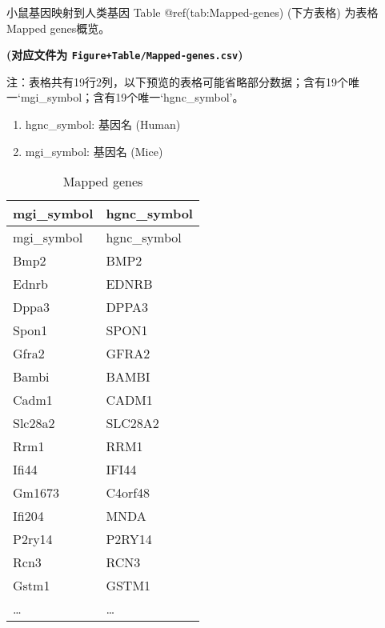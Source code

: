 \documentclass[
  ignorenonframetext,
]{beamer}
\providecommand{\tightlist}{%
  \setlength{\itemsep}{0pt}\setlength{\parskip}{0pt}}
\begin{document}
\begin{frame}[fragile]{小鼠基因映射到人类基因}
\protect\hypertarget{ux5c0fux9f20ux57faux56e0ux6620ux5c04ux5230ux4ebaux7c7bux57faux56e0}{}
Table @ref(tab:Mapped-genes) (下方表格) 为表格Mapped genes概览。

\textbf{(对应文件为 \texttt{Figure+Table/Mapped-genes.csv})}

\begin{center}\begin{tcolorbox}[colback=gray!10, colframe=gray!50, width=0.9\linewidth, arc=1mm, boxrule=0.5pt]注：表格共有19行2列，以下预览的表格可能省略部分数据；含有19个唯一`mgi\_symbol；含有19个唯一`hgnc\_symbol'。
\end{tcolorbox}
\end{center}
\begin{center}\begin{tcolorbox}[colback=gray!10, colframe=gray!50, width=0.9\linewidth, arc=1mm, boxrule=0.5pt]\begin{enumerate}\tightlist
\item hgnc\_symbol:  基因名 (Human)
\item mgi\_symbol:  基因名 (Mice)
\end{enumerate}\end{tcolorbox}
\end{center}

\begin{longtable}[]{@{}ll@{}}
\caption{Mapped genes}\tabularnewline
\toprule
mgi\_symbol & hgnc\_symbol\tabularnewline
\midrule
\endfirsthead
\toprule
mgi\_symbol & hgnc\_symbol\tabularnewline
\midrule
\endhead
Bmp2 & BMP2\tabularnewline
Ednrb & EDNRB\tabularnewline
Dppa3 & DPPA3\tabularnewline
Spon1 & SPON1\tabularnewline
Gfra2 & GFRA2\tabularnewline
Bambi & BAMBI\tabularnewline
Cadm1 & CADM1\tabularnewline
Slc28a2 & SLC28A2\tabularnewline
Rrm1 & RRM1\tabularnewline
Ifi44 & IFI44\tabularnewline
Gm1673 & C4orf48\tabularnewline
Ifi204 & MNDA\tabularnewline
P2ry14 & P2RY14\tabularnewline
Rcn3 & RCN3\tabularnewline
Gstm1 & GSTM1\tabularnewline
\ldots{} & \ldots{}\tabularnewline
\bottomrule
\end{longtable}
\end{frame}
\end{document}
